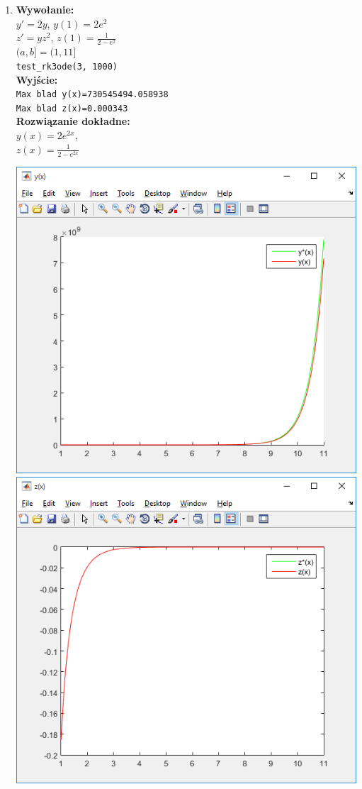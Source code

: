 \documentclass[]{article}
\begin{document}
\begin{enumerate}
\begin{center}
\end{center}
\item \textbf{Wywołanie:}\\
$y'=2y$,\hspace{7mm}      $y(1)=2e^2$\\
$z'=yz^2$,\hspace{5mm}   $z(1)=\frac{1}{2-e^{2}}$\\
$(a,b] = (1,11]$
\\
\verb|test_rk3ode(3, 1000)|
\\\textbf{Wyjście:}\\
\verb|Max blad y(x)=730545494.058938|\\
\verb|Max blad z(x)=0.000343|\\
\textbf{Rozwiązanie dokładne:}\\ $y(x)= 2e^{2x}$,\\ $z(x)= \frac{1}{2-e^{2x}}$
\begin{center}
	\includegraphics[scale=0.8]{y3.png}\\
	\includegraphics[scale=0.8]{z3.png}

\end{center}
\end{enumerate}
\end{document}

